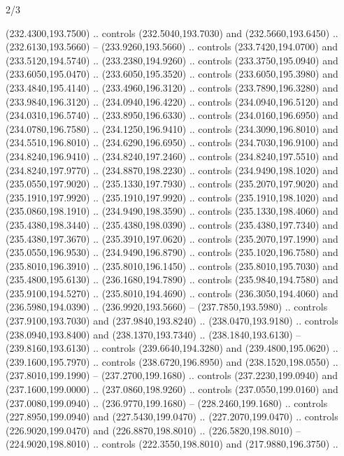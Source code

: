\begin{flagdescription}{2/3}
\begin{scope}[xshift=0.5\flaglength,yshift=0.5\flagwidth,scale=\flagwidth/259.2]
\begin{scope}[y=0.8pt, x=0.8pt, yscale=-1,shift={(-243,-162)}]
      (232.4300,193.7500) .. controls (232.5040,193.7030) and (232.5660,193.6450) ..
      (232.6130,193.5660) -- (233.9260,193.5660) .. controls (233.7420,194.0700) and
      (233.5120,194.5740) .. (233.2380,194.9260) .. controls (233.3750,195.0940) and
      (233.6050,195.0470) .. (233.6050,195.3520) .. controls (233.6050,195.3980) and
      (233.4840,195.4140) .. (233.4960,196.3120) .. controls (233.7890,196.3280) and
      (233.9840,196.3120) .. (234.0940,196.4220) .. controls (234.0940,196.5120) and
      (234.0310,196.5740) .. (233.8950,196.6330) .. controls (234.0160,196.6950) and
      (234.0780,196.7580) .. (234.1250,196.9410) .. controls (234.3090,196.8010) and
      (234.5510,196.8010) .. (234.6290,196.6950) .. controls (234.7030,196.9100) and
      (234.8240,196.9410) .. (234.8240,197.2460) .. controls (234.8240,197.5510) and
      (234.8240,197.9770) .. (234.8870,198.2230) .. controls (234.9490,198.1020) and
      (235.0550,197.9020) .. (235.1330,197.7930) .. controls (235.2070,197.9020) and
      (235.1910,197.9920) .. (235.1910,197.9920) .. controls (235.1910,198.1020) and
      (235.0860,198.1910) .. (234.9490,198.3590) .. controls (235.1330,198.4060) and
      (235.4380,198.3440) .. (235.4380,198.0390) .. controls (235.4380,197.7340) and
      (235.4380,197.3670) .. (235.3910,197.0620) .. controls (235.2070,197.1990) and
      (235.0550,196.9530) .. (234.9490,196.8790) .. controls (235.1020,196.7580) and
      (235.8010,196.3910) .. (235.8010,196.1450) .. controls (235.8010,195.7030) and
      (235.4800,195.6130) .. (236.1680,194.7890) .. controls (235.9840,194.7580) and
      (235.9100,194.5270) .. (235.8010,194.4690) .. controls (236.3050,194.4060) and
      (236.5980,194.0390) .. (236.9920,193.5660) -- (237.7850,193.5980) .. controls
      (237.9100,193.7030) and (237.9840,193.8240) .. (238.0470,193.9180) .. controls
      (238.0940,193.8400) and (238.1370,193.7340) .. (238.1840,193.6130) --
      (239.8160,193.6130) .. controls (239.6640,194.3280) and (239.4800,195.0620) ..
      (239.1600,195.7970) .. controls (238.6720,196.8950) and (238.1520,198.0550) ..
      (237.8010,199.1990) -- (237.2700,199.1680) .. controls (237.2230,199.0940) and
      (237.1600,199.0000) .. (237.0860,198.9260) .. controls (237.0550,199.0160) and
      (237.0080,199.0940) .. (236.9770,199.1680) -- (228.2460,199.1680) .. controls
      (227.8950,199.0940) and (227.5430,199.0470) .. (227.2070,199.0470) .. controls
      (226.9020,199.0470) and (226.8870,198.8010) .. (226.5820,198.8010) --
      (224.9020,198.8010) .. controls (222.3550,198.8010) and (217.9880,196.3750) ..

\end{scope}
\end{scope}
\end{flagdescription}
